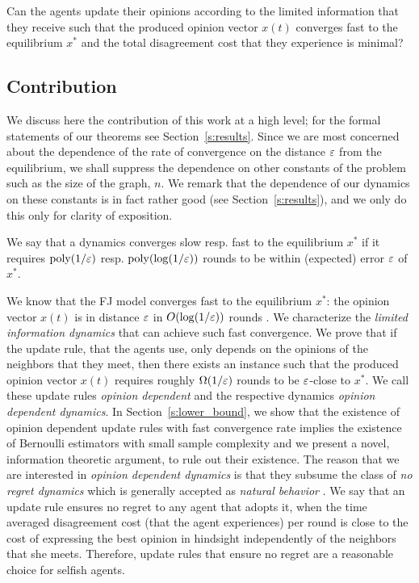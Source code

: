 \begin{question}\label{q:motivation2}
  Can the agents update their opinions according to the limited information
  that they receive such that the produced opinion vector $x(t)$ converges fast
  to the equilibrium $x^*$ and the total disagreement cost that they experience
  is minimal?
\end{question}

\subsection{Contribution} We discuss here the contribution of this work at a
high level; for the formal statements of our theorems see
Section~\ref{s:results}.  Since we are most concerned about the dependence of
the rate of convergence on the distance $\varepsilon$ from the equilibrium, we shall
suppress the dependence on other constants of the problem such as the size of
the graph, $n$.  We remark that the dependence of our dynamics on these
constants is in fact rather good (see Section~\ref{s:results}), and we only do
this only for clarity of exposition.

\begin{definition}[Informal]\label{d:convergence_rate}
  We say that a dynamics converges slow resp. fast to the equilibrium $x^*$ if
  it requires $\mathrm{poly}(1/\varepsilon)$ resp. $\mathrm{poly}(\log(1/\varepsilon))$ rounds to
  be within (expected) error $\varepsilon$ of $x^*$.
\end{definition}

We know that the FJ model converges fast to the equilibrium $x^*$: the opinion
vector $x(t)$ is in distance $\varepsilon$ in $O(\log (1/\varepsilon))$ rounds \cite{GS14}.
We characterize the \emph{limited information dynamics} that can achieve such
fast convergence.  We prove that if the update rule, that the agents use, only
depends on the opinions of the neighbors that they meet, then there exists an
instance such that the produced opinion vector $x(t)$ requires roughly
$\Omega(1/\varepsilon)$ rounds to be $\varepsilon$-close to $x^*$. We call these update rules
\emph{opinion dependent} and the respective dynamics \emph{opinion dependent
  dynamics}.  In Section~\ref{s:lower_bound}, we show that the existence of
opinion dependent update rules with fast convergence rate implies the existence
of Bernoulli estimators with small sample complexity and we present a novel,
information theoretic argument, to rule out their existence.  The reason that
we are interested in \emph{opinion dependent dynamics} is that they subsume the
class of \emph{no regret dynamics} which is generally accepted as \emph{natural
  behavior}  \cite{EMN09}.  We say that an update rule ensures no regret to any
agent that adopts it, when the time averaged disagreement cost (that the agent
experiences) per round is close to the cost of expressing the best opinion in
hindsight independently of the neighbors that she meets. Therefore, update
rules that ensure no regret are a reasonable choice for selfish agents.

